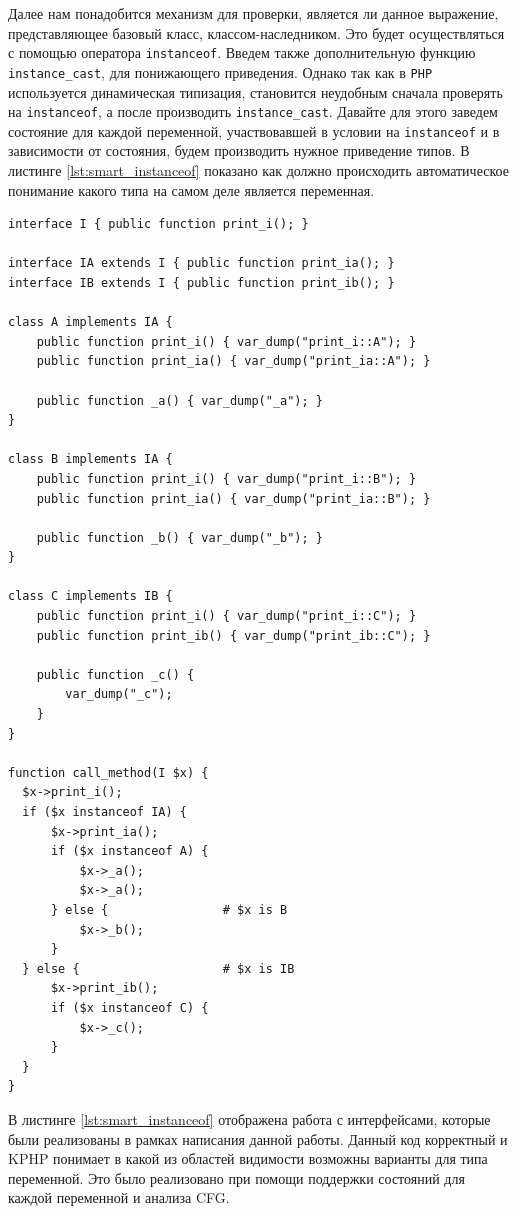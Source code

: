 Далее нам понадобится механизм для проверки, является ли данное выражение, представляющее базовый класс, классом-наследником.
Это будет осуществляться с помощью оператора \verb|instanceof|.
Введем также дополнительную функцию \verb|instance_cast|, для понижающего приведения.
Однако так как в \verb|PHP| используется динамическая типизация, становится неудобным сначала проверять на \verb|instanceof|, а после производить \verb|instance_cast|.
Давайте для этого заведем состояние для каждой переменной, участвовавшей в условии на \verb|instanceof| и в зависимости от состояния, будем производить нужное приведение типов.
В листинге \ref{lst:smart_instanceof} показано как должно происходить автоматическое понимание какого типа на самом деле является переменная.
\begin{lstlisting}[caption={Пример использования умного оператора instanceof},label={lst:smart_instanceof}]
interface I { public function print_i(); }

interface IA extends I { public function print_ia(); }
interface IB extends I { public function print_ib(); }

class A implements IA {
    public function print_i() { var_dump("print_i::A"); }
    public function print_ia() { var_dump("print_ia::A"); }

    public function _a() { var_dump("_a"); }
}

class B implements IA {
    public function print_i() { var_dump("print_i::B"); }
    public function print_ia() { var_dump("print_ia::B"); }

    public function _b() { var_dump("_b"); }
}

class C implements IB {
    public function print_i() { var_dump("print_i::C"); }
    public function print_ib() { var_dump("print_ib::C"); }

    public function _c() {
        var_dump("_c");
    }
}

function call_method(I $x) {
  $x->print_i();
  if ($x instanceof IA) {
      $x->print_ia();
      if ($x instanceof A) {
          $x->_a();
          $x->_a();
      } else {                # $x is B
          $x->_b();
      }
  } else {                    # $x is IB
      $x->print_ib();
      if ($x instanceof C) {
          $x->_c();
      }
  }
}
\end{lstlisting}

В листинге \ref{lst:smart_instanceof} отображена работа с интерфейсами, которые были реализованы в рамках написания данной работы.
Данный код корректный и KPHP понимает в какой из областей видимости возможны варианты для типа переменной.
Это было реализовано при помощи поддержки состояний для каждой переменной и анализа CFG.

